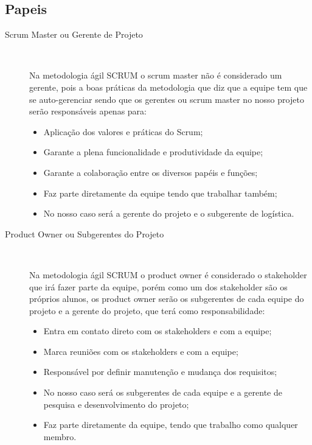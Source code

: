 \subsection{Papeis}

  \begin{description}
    \item[Scrum Master ou Gerente de Projeto] \

      Na metodologia ágil SCRUM o scrum master não é considerado um gerente, pois a boas práticas da metodologia que diz que a equipe
      tem que se auto-gerenciar sendo que os gerentes ou scrum master no nosso projeto serão responsáveis apenas para:

      \begin{itemize}
        \item Aplicação dos valores e práticas do Scrum;
        \item Garante a plena funcionalidade e produtividade da equipe;
        \item Garante a colaboração entre os diversos papéis e funções;
        \item Faz parte diretamente da equipe tendo que trabalhar também;
        \item No nosso caso será a gerente do projeto e o subgerente de logística.
      \end{itemize}

    \item[Product Owner ou Subgerentes do Projeto] \

      Na metodologia ágil SCRUM o product owner é considerado o stakeholder que irá fazer parte da equipe, porém como um dos stakeholder
      são os próprios alunos, os product owner serão os subgerentes de cada equipe do projeto e a gerente do projeto, que terá como
      responsabilidade:

      \begin{itemize}
        \item Entra em contato direto com os stakeholders e com a equipe;
        \item Marca reuniões com os stakeholders e com a equipe;
        \item Responsável por definir manutenção e mudança dos requisitos;
        \item No nosso caso será os subgerentes de cada equipe e a gerente de pesquisa e desenvolvimento do projeto;
        \item Faz parte diretamente da equipe, tendo que trabalho como qualquer membro.
      \end{itemize}


\end{description}
